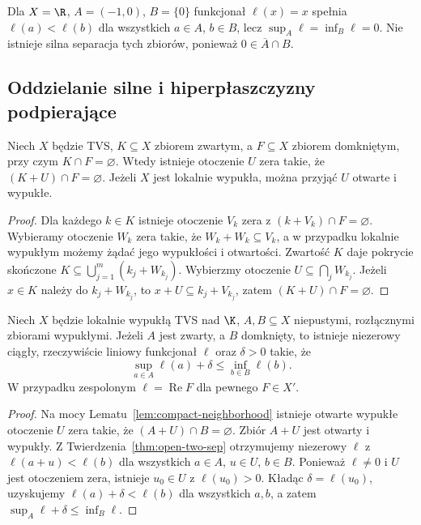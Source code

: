 \begin{przyklad}
Dla $X=\R$, $A=(-1,0)$, $B=\{0\}$ funkcjonał
$\ell(x)=x$ spełnia $\ell(a)<\ell(b)$ dla wszystkich
$a\in A$, $b\in B$, lecz $\sup_A\ell=\inf_B\ell=0$.
Nie istnieje silna separacja tych zbiorów, ponieważ
$0\in\overline A\cap B$.
\end{przyklad}

\subsection{Oddzielanie silne i hiperpłaszczyzny podpierające}

\begin{lemat}
\label{lem:compact-neighborhood}
Niech $X$ będzie TVS, $K\subseteq X$ zbiorem zwartym,
a $F\subseteq X$ zbiorem domkniętym, przy czym $K\cap F=\varnothing$.
Wtedy istnieje otoczenie $U$ zera takie, że
$(K+U)\cap F=\varnothing$. Jeżeli $X$ jest lokalnie wypukła,
można przyjąć $U$ otwarte i wypukłe.
\end{lemat}
\begin{proof}
Dla każdego $k\in K$ istnieje otoczenie $V_k$ zera
z $(k+V_k)\cap F=\varnothing$. Wybieramy otoczenie
$W_k$ zera takie, że $W_k+W_k\subseteq V_k$,
a w przypadku lokalnie wypukłym możemy żądać
jego wypukłości i otwartości. Zwartość $K$ daje
pokrycie skończone $K\subseteq\bigcup_{j=1}^m(k_j+W_{k_j})$.
Wybierzmy otoczenie $U\subseteq\bigcap_j W_{k_j}$.
Jeżeli $x\in K$ należy do $k_j+W_{k_j}$, to
$x+U\subseteq k_j+V_{k_j}$, zatem $(K+U)\cap F=\varnothing$.
\end{proof}

\begin{twierdzenie}
\label{thm:strong-separation}
Niech $X$ będzie lokalnie wypukłą TVS nad $\K$,
$A,B\subseteq X$ niepustymi, rozłącznymi zbiorami wypukłymi.
Jeżeli $A$ jest zwarty, a $B$ domknięty, to istnieje
niezerowy ciągły, rzeczywiście liniowy funkcjonał $\ell$
oraz $\delta>0$ takie, że
\[
\sup_{a\in A}\ell(a)+\delta\le\inf_{b\in B}\ell(b).
\]
W przypadku zespolonym $\ell=\operatorname{Re}F$ dla pewnego $F\in X'$.
\end{twierdzenie}
\begin{proof}
Na mocy Lematu~\ref{lem:compact-neighborhood} istnieje
otwarte wypukłe otoczenie $U$ zera takie, że
$(A+U)\cap B=\varnothing$. Zbiór $A+U$ jest otwarty
i wypukły. Z Twierdzenia~\ref{thm:open-two-sep}
otrzymujemy niezerowy $\ell$ z
$\ell(a+u)<\ell(b)$ dla wszystkich
$a\in A$, $u\in U$, $b\in B$. Ponieważ $\ell\ne0$
i $U$ jest otoczeniem zera, istnieje $u_0\in U$
z $\ell(u_0)>0$. Kładąc $\delta=\ell(u_0)$, uzyskujemy
$\ell(a)+\delta<\ell(b)$ dla wszystkich $a,b$,
a zatem $\sup_A\ell+\delta\le\inf_B\ell$.
\end{proof}

